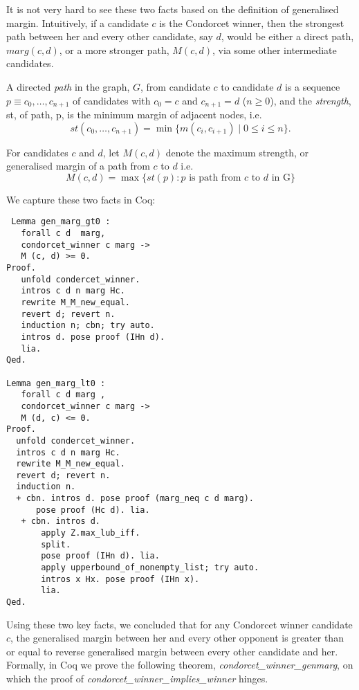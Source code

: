  
 It is not very hard to see these two facts based on the definition of generalised margin. Intuitively, 
 if a candidate $c$ is the Condorcet winner, then the strongest path between her and every other 
 candidate, say $d$,  would be either a direct path, $marg (c, d)$, or a more stronger path, $M (c, d)$, 
 via some other intermediate candidates. 
  
 \begin{displayquote}
 A directed \emph{path} in the graph, $G$, from
candidate $c$ to candidate $d$ is a sequence $p \equiv c_0, \dots, c_{n+1}$
of candidates with $c_0 = c$ and $c_{n+1} = d$ ($n \geq 0$), and the
\emph{strength}, st, of path, p, is the minimum margin of adjacent
nodes, i.e.
\[ st(c_0, \dots, c_{n+1}) = \min \lbrace m (c_i, c_{i+1}) \mid 0
\leq i \leq n \rbrace. \]
\item For candidates $c$ and $d$, let $M(c, d)$ denote the maximum strength, or generalised margin of a path
	from $c$ to $d$ i.e. 
	\[ M(c, d) = \max \lbrace st (p) : p \text{  is path from } c \text{ to } d \text{ in G} \rbrace\]
  
   \end{displayquote}
   
 We capture these two facts in Coq:
 
 \begin{verbatim}
 Lemma gen_marg_gt0 :
   forall c d  marg, 
   condorcet_winner c marg -> 
   M (c, d) >= 0.
Proof. 
   unfold condercet_winner.
   intros c d n marg Hc.
   rewrite M_M_new_equal. 
   revert d; revert n.
   induction n; cbn; try auto.
   intros d. pose proof (IHn d).
   lia.
Qed.

Lemma gen_marg_lt0 :
   forall c d marg , 
   condorcet_winner c marg ->
   M (d, c) <= 0.
Proof.
  unfold condercet_winner.
  intros c d n marg Hc.
  rewrite M_M_new_equal.
  revert d; revert n.
  induction n.
  + cbn. intros d. pose proof (marg_neq c d marg).
      pose proof (Hc d). lia. 
   + cbn. intros d.
       apply Z.max_lub_iff. 
       split.
       pose proof (IHn d). lia.
       apply upperbound_of_nonempty_list; try auto.
       intros x Hx. pose proof (IHn x).
       lia.
Qed.
\end{verbatim}   
 
 Using these two key facts, we concluded that for any Condorcet winner candidate $c$, 
 the generalised margin between her and every other opponent is greater than or equal 
 to reverse generalised margin between every other candidate and her.  Formally, 
 in Coq we prove the following theorem, \textit{condorcet\_winner\_genmarg}, on which  the proof of 
 \textit{condorcet\_winner\_implies\_winner} hinges. 
 

